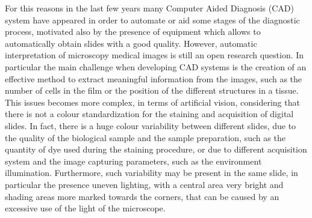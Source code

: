 \documentclass[final,a4paper,12pt,english]{UnicaPhdThesis3}
\begin{document}
	For this reasons in the last few years many Computer Aided Diagnosis (\acs{CAD}) system have appeared in order to automate or aid some stages of the diagnostic process, motivated also by the presence of equipment which allows to automatically obtain slides with a good quality. However, automatic interpretation of microscopy medical images is still an open research question. In particular the main challenge when developing CAD systems is the creation of an effective method to extract meaningful information from the images, such as the number of cells in the film or the position of the different structures in a tissue. This issues becomes more complex, in terms of artificial vision,  considering that there is not a colour standardization for the staining and acquisition of digital slides. In fact, there is a huge colour variability between different slides, due to the quality of the biological sample and the sample preparation, such as the quantity of dye used during the staining procedure, or due to different acquisition system and the image capturing parameters, such as the environment illumination. Furthermore, such variability may be present in the same slide, in particular the presence  
	uneven lighting, with a central area very bright and shading areas more marked towards the corners, that can be caused by an excessive use of the light of the microscope.
	
\end{document}
